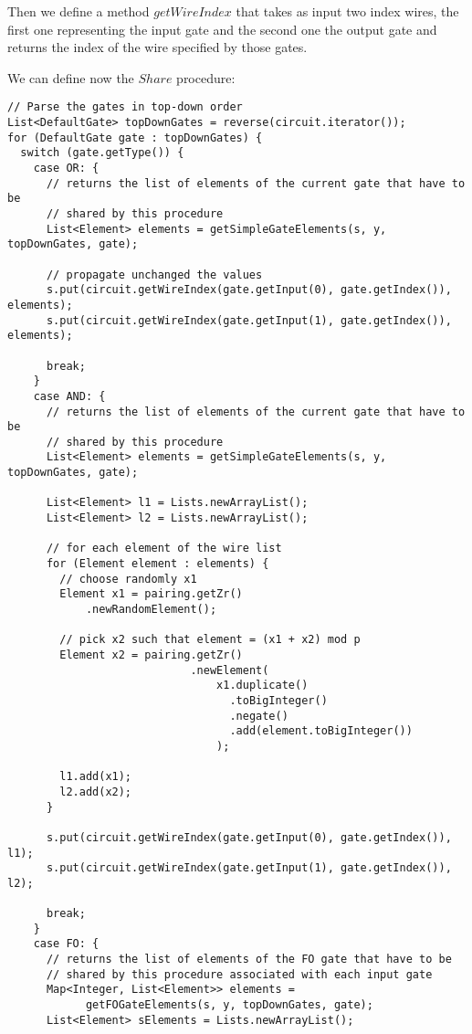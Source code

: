 \documentclass[12pt]{article}
\begin{document}
Then we define a method $getWireIndex$ that takes as input two index wires, the first one representing the input gate and the second one the output gate and returns the index of the wire specified by those gates. 

We can define now the $Share$ procedure:

\begin{lstlisting}
// Parse the gates in top-down order
List<DefaultGate> topDownGates = reverse(circuit.iterator());
for (DefaultGate gate : topDownGates) {
  switch (gate.getType()) {
    case OR: {
      // returns the list of elements of the current gate that have to be
      // shared by this procedure
      List<Element> elements = getSimpleGateElements(s, y, topDownGates, gate);
      
      // propagate unchanged the values
      s.put(circuit.getWireIndex(gate.getInput(0), gate.getIndex()), elements);
      s.put(circuit.getWireIndex(gate.getInput(1), gate.getIndex()), elements);

      break;
    }
    case AND: {
      // returns the list of elements of the current gate that have to be
      // shared by this procedure
      List<Element> elements = getSimpleGateElements(s, y, topDownGates, gate);

      List<Element> l1 = Lists.newArrayList();
      List<Element> l2 = Lists.newArrayList();
        
      // for each element of the wire list
      for (Element element : elements) {
        // choose randomly x1
        Element x1 = pairing.getZr()
            .newRandomElement();
            
        // pick x2 such that element = (x1 + x2) mod p
        Element x2 = pairing.getZr()
                            .newElement(
                                x1.duplicate()
                                  .toBigInteger()
                                  .negate()
                                  .add(element.toBigInteger())
                                );

        l1.add(x1);
        l2.add(x2);
      }

      s.put(circuit.getWireIndex(gate.getInput(0), gate.getIndex()), l1);
      s.put(circuit.getWireIndex(gate.getInput(1), gate.getIndex()), l2);

      break;
    }
    case FO: {
      // returns the list of elements of the FO gate that have to be
      // shared by this procedure associated with each input gate
      Map<Integer, List<Element>> elements = 
            getFOGateElements(s, y, topDownGates, gate);
      List<Element> sElements = Lists.newArrayList();


\end{lstlisting}
\end{document}
